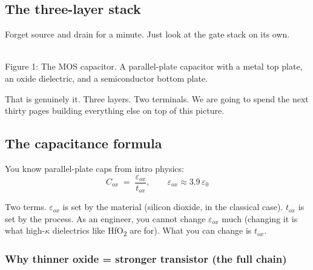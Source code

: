 \documentclass[11pt]{article}
\begin{document}
\subsection{The three-layer stack}

Forget source and drain for a minute. Just look at the gate stack on its own.

\begin{center}
\\
{\small Figure 1: The MOS capacitor. A parallel-plate capacitor with a metal top plate, an oxide dielectric, and a semiconductor bottom plate.}
\end{center}

That is genuinely it. Three layers. Two terminals. We are going to spend the next thirty pages building everything else on top of this picture.

\subsection{The capacitance formula}

You know parallel-plate caps from intro physics:
\begin{equation}
C_{ox} \;=\; \frac{\varepsilon_{ox}}{t_{ox}}, \qquad \varepsilon_{ox} \approx 3.9\,\varepsilon_0
\end{equation}

Two terms. $\varepsilon_{ox}$ is set by the material (silicon dioxide, in the classical case). $t_{ox}$ is set by the process. As an engineer, you cannot change $\varepsilon_{ox}$ much (changing it is what high-$\kappa$ dielectrics like HfO\textsubscript{2} are for). What you can change is $t_{ox}$.

\subsubsection{Why thinner oxide = stronger transistor (the full chain)}
\end{document}
